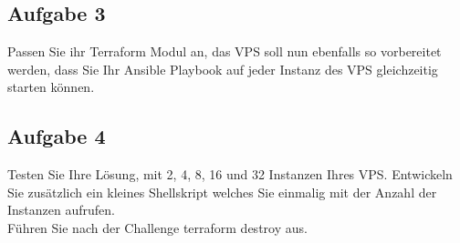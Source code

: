 \documentclass{article}
\begin{document}
    \subsection{Aufgabe 3}
    Passen Sie ihr Terraform Modul an, das VPS soll nun ebenfalls so vorbereitet werden, dass Sie Ihr Ansible Playbook auf jeder Instanz des VPS gleichzeitig starten können.

    \subsection{Aufgabe 4}
    Testen Sie Ihre Lösung, mit 2, 4, 8, 16 und 32 Instanzen Ihres VPS.
    Entwickeln Sie zusätzlich ein kleines Shellskript welches Sie einmalig mit der Anzahl der Instanzen aufrufen. \\ 
    Führen Sie nach der Challenge terraform destroy aus.
\end{document}
